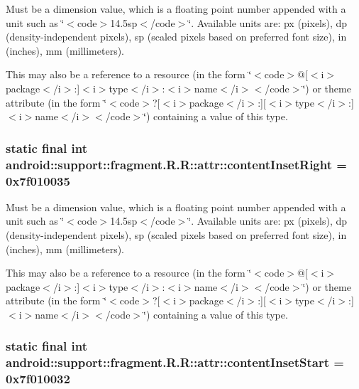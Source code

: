 Must be a dimension value, which is a floating point number appended with a unit such as \char`\"{}$<$code$>$14.5sp$<$/code$>$\char`\"{}. Available units are: px (pixels), dp (density-independent pixels), sp (scaled pixels based on preferred font size), in (inches), mm (millimeters). 

This may also be a reference to a resource (in the form \char`\"{}$<$code$>$@\mbox{[}$<$i$>$package$<$/i$>$:\mbox{]}$<$i$>$type$<$/i$>$:$<$i$>$name$<$/i$>$$<$/code$>$\char`\"{}) or theme attribute (in the form \char`\"{}$<$code$>$?\mbox{[}$<$i$>$package$<$/i$>$:\mbox{]}\mbox{[}$<$i$>$type$<$/i$>$:\mbox{]}$<$i$>$name$<$/i$>$$<$/code$>$\char`\"{}) containing a value of this type. \hypertarget{classandroid_1_1support_1_1fragment_1_1_r_1_1attr_3f2d55cd88056aed4e4edcd791eee2d5}{
\subsubsection[{contentInsetRight}]{\setlength{\rightskip}{0pt plus 5cm}static final int android::support::fragment.R.R::attr::contentInsetRight = 0x7f010035}}
\label{classandroid_1_1support_1_1fragment_1_1_r_1_1attr_3f2d55cd88056aed4e4edcd791eee2d5}


Must be a dimension value, which is a floating point number appended with a unit such as \char`\"{}$<$code$>$14.5sp$<$/code$>$\char`\"{}. Available units are: px (pixels), dp (density-independent pixels), sp (scaled pixels based on preferred font size), in (inches), mm (millimeters). 

This may also be a reference to a resource (in the form \char`\"{}$<$code$>$@\mbox{[}$<$i$>$package$<$/i$>$:\mbox{]}$<$i$>$type$<$/i$>$:$<$i$>$name$<$/i$>$$<$/code$>$\char`\"{}) or theme attribute (in the form \char`\"{}$<$code$>$?\mbox{[}$<$i$>$package$<$/i$>$:\mbox{]}\mbox{[}$<$i$>$type$<$/i$>$:\mbox{]}$<$i$>$name$<$/i$>$$<$/code$>$\char`\"{}) containing a value of this type. \hypertarget{classandroid_1_1support_1_1fragment_1_1_r_1_1attr_cbb2535198ad621d8aaf2b579656e31f}{
\subsubsection[{contentInsetStart}]{\setlength{\rightskip}{0pt plus 5cm}static final int android::support::fragment.R.R::attr::contentInsetStart = 0x7f010032}}
\label{classandroid_1_1support_1_1fragment_1_1_r_1_1attr_cbb2535198ad621d8aaf2b579656e31f}


